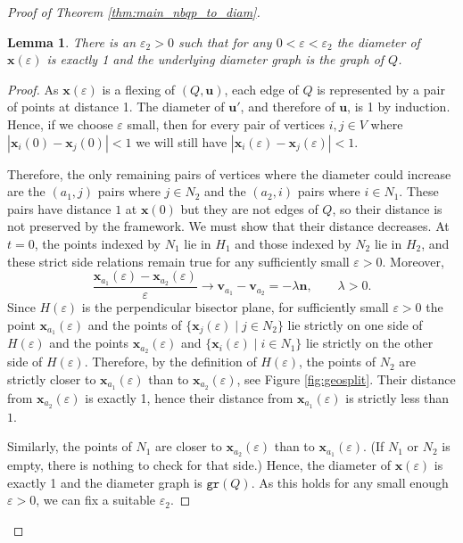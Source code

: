 \documentclass[10pt,a4paper]{article}
\newtheorem{lemma}[theorem]{Lemma}
\newcommand{\vu}[0]{\mathbf{u}}
\newcommand{\vv}[0]{\mathbf{v}}
\newcommand{\vn}[0]{\mathbf{n}}
\newcommand{\vx}[0]{\mathbf{x}}
\newcommand{\gr}{\mathtt{gr}}
\begin{document}
\begin{proof}[Proof of Theorem \ref{thm:main_nbqp_to_diam}]
    \begin{lemma}\label{lem:diametergraphcorrect}
        There is an $\varepsilon_2>0$ such that for any $0<\varepsilon<\varepsilon_2$ the diameter of $\vx(\varepsilon)$ is exactly 1 and the underlying diameter graph is the graph of $Q$.
    \end{lemma}
     \begin{proof}
         
      As $\vx(\varepsilon)$ is a flexing of $(Q,\vu)$, each edge of $Q$ is represented by a pair of points at distance 1. The diameter of $\vu'$, and therefore of $\vu$, is 1 by induction. Hence, if we choose $\varepsilon$ small, then for every pair of vertices $i,j\in V$ where $|\vx_i(0)-\vx_j(0)|<1$ we will still have $|\vx_i(\varepsilon)-\vx_j(\varepsilon)|<1$. 
      
     


            

Therefore, the only remaining pairs of vertices where the diameter could increase are the $(a_1,j)$ pairs where $j\in N_2$ and the $(a_2,i)$ pairs where $i\in N_1$. These pairs have distance $1$ at $\vx(0)$ but they are not edges of $Q$, so their distance is not preserved by the framework. We must show that their distance decreases. At $t=0$, the points indexed by $N_1$ lie in $H_1$ and those indexed by $N_2$ lie in $H_2$, and these strict side relations remain true for any sufficiently small $\varepsilon>0$. Moreover,
      \[
          \frac{\vx_{a_1}(\varepsilon)-\vx_{a_2}(\varepsilon)}{\varepsilon}
          \longrightarrow \vv_{a_1}-\vv_{a_2}=-\lambda\vn,
          \qquad \lambda>0.
      \]
      Since $H(\varepsilon)$ is the perpendicular bisector plane, for sufficiently small $\varepsilon>0$ the point $\vx_{a_1}(\varepsilon)$ and the points of $\{\vx_{j}(\varepsilon)\mid j\in N_2\}$ lie strictly on one side of $H(\varepsilon)$ and the points $\vx_{a_2}(\varepsilon)$ and $\{\vx_{i}(\varepsilon)\mid i \in N_1\}$ lie strictly on the other side of $H(\varepsilon)$. Therefore, by the definition of $H(\varepsilon)$, the points of $N_2$ are strictly closer to $\vx_{a_1}(\varepsilon)$ than to $\vx_{a_2}(\varepsilon)$, see Figure \ref{fig:geosplit}. Their distance from $\vx_{a_2}(\varepsilon)$ is exactly 1, hence their distance from $\vx_{a_1}(\varepsilon)$ is strictly less than $1$. 

Similarly, the points of $N_1$ are closer to $\vx_{a_2}(\varepsilon)$ than to $\vx_{a_1}(\varepsilon)$. (If $N_1$ or $N_2$ is empty, there is nothing to check for that side.) Hence, the diameter of $\vx(\varepsilon)$ is exactly 1 and the diameter graph is $\gr (Q)$. As this holds for any small enough $\varepsilon>0$, we can fix a suitable $\varepsilon_2$. 
    \end{proof}


\end{proof}
\end{document}
